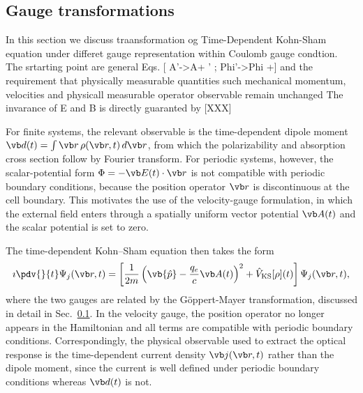 
\subsection{ Gauge  transformations}
\label{sec:velocity_gauge}

In this section we discuss traansformation og Time-Dependent Kohn-Sham  equation  under differet gauge representation within Coulomb gauge condtion.
The srtarting point are  general Eqs. [ A'->A+ '  ; Phi'->Phi +]   and  the requirement that physically measurable quantities such  mechanical momentum, velocities
 and  physicall measurable  operator observable remain unchanged 
The  invarance of E and B is directly guaranted by   [XXX] 


For finite systems, the relevant observable is the
time-dependent dipole moment $\vb d(t) = \int \vb r\,
\rho(\vb r,t)\, d\vb r$, from which the polarizability
and absorption cross section follow by Fourier transform.
For periodic systems, however, the scalar-potential form
$\Phi = -\vb E(t)\cdot\vb r$ is not compatible with
periodic boundary conditions, because the position
operator $\vb r$ is discontinuous at the cell boundary.
This motivates the use of the velocity-gauge formulation,
in which the external field enters through a spatially
uniform vector potential $\vb A(t)$ and the scalar
potential is set to zero.

The time-dependent Kohn--Sham equation then takes the form
\begin{equation}
  \imath \pdv{}{t} \Psi_j(\vb r,t) = \left[
    \frac{1}{2m}\left(\vb{\hat p}
    - \frac{q_e}{c}\vb A(t)\right)^2
    + \hat V_{\mathrm{KS}}[\rho](t)
  \right] \Psi_j(\vb r,t),
  \label{eq:tdks_velocity_gauge}
\end{equation}
where the two gauges are related by the Göppert-Mayer
transformation, discussed in detail in
Sec.~\ref{sec:velocity_gauge}.
In the velocity gauge, the position operator no longer
appears in the Hamiltonian and all terms are compatible
with periodic boundary conditions.
Correspondingly, the physical observable used to extract
the optical response is the time-dependent current density
$\vb j(\vb r,t)$ rather than the dipole moment, since
the current is well defined under periodic boundary
conditions whereas $\vb d(t)$ is not.







